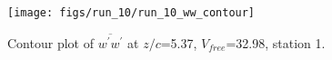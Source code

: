 \begin{figure}[H]
\centering
\texttt{[image: figs/run\_10/run\_10\_ww\_contour]}
\caption{Contour plot of $\overline{w^\prime w^\prime}$ at $z/c$=5.37, $V_{free}$=32.98, station 1.}
\label{fig:run_10_ww_contour}
\end{figure}


